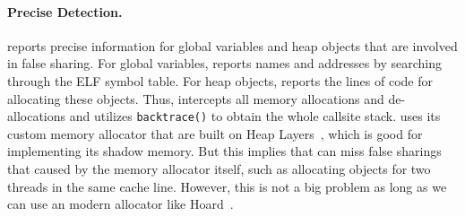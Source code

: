 \paragraph{Precise Detection.} \Cheetah{} reports precise information for global variables and heap objects that are involved in false sharing. For global variables, \Cheetah{} reports names and addresses by searching through the ELF symbol table. For heap objects, \Cheetah{} reports the lines of code for allocating these objects.  
Thus, \Cheetah{} intercepts all memory allocations and de-allocations and utilizes \texttt{backtrace()} to obtain the whole callsite stack.  \Cheetah{} uses its custom memory allocator that are built on Heap Layers~\cite{heaplayers}, which is good for implementing its shadow memory. But this implies that \Cheetah{} can miss false sharings that caused by the memory allocator itself, such as allocating objects for two threads in the same cache line. However, this is not a big problem as long as we can use an modern allocator like Hoard~\cite{Hoard}. 






 